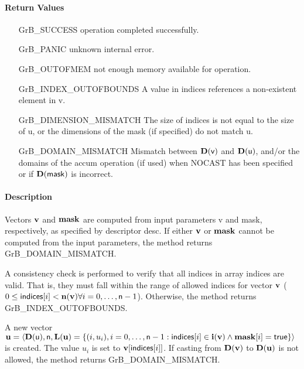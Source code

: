\paragraph{Return Values}

\begin{itemize}[leftmargin=2.1in]
\item[{\sf GrB\_SUCCESS}]     operation completed successfully.
\item[{\sf GrB\_PANIC}]        unknown internal error.
\item[{\sf GrB\_OUTOFMEM}]    not enough memory available for operation.
\item[{\sf GrB\_INDEX\_OUTOFBOUNDS}]
        A value in {\sf indices} references a non-existent element in {\sf v}.
\item[{\sf GrB\_DIMENSION\_MISMATCH}] 
        The size of {\sf indices} is not equal to the size of {\sf u}, or
        the dimensions of the mask (if specified) do not match {\sf u}.
\item[{\sf GrB\_DOMAIN\_MISMATCH}]    Mismatch between $\bold{D}({\sf v})$ and $\bold{D}({\sf u})$, and/or the domains of the 
                                     {\sf accum} operation (if used) when {\sf NOCAST} has
                                      been specified or if $\bold{D}(\sf mask)$ is incorrect.
\end{itemize}

\paragraph{Description}

Vectors ${\bf v}$ and ${\bf mask}$ are computed from input
parameters {\sf v} and {\sf mask}, respectively, as specified by
descriptor {\sf desc}.  If either ${\bf v}$ or ${\bf mask}$
cannot be computed from the input parameters, the method returns {\sf
GrB\_DOMAIN\_MISMATCH}.

A consistency check is performed to verify that all indices in array
{\sf indices} are valid. That is, they must fall within the range of allowed
indices for vector ${\bf v}$ ($0 \leq {\sf indices}[i] < \bold{n}({\bf v})
\forall i = 0,\ldots,{\sf n}-1$).  Otherwise, the method returns {\sf
GrB\_INDEX\_OUTOFBOUNDS}.

A new vector ${\bf u} = \langle \bold{D}({\sf u}),{\sf n},
\bold{L}({\bf u}) = \{ (i,u_i), i = 0,\ldots,{\sf n}-1 : {\sf indices}[i]
\in \bold{i}({\bf v}) \wedge {\bf mask}[i] = {\sf true} \} \rangle$
is created.  The value $u_i$ is set to ${\bf v}[{\sf indices}[i]]$. If
casting from $\bold{D}({\bf v})$ to $\bold{D}({\bf u})$ is not
allowed, the method returns {\sf GrB\_DOMAIN\_MISMATCH}.


